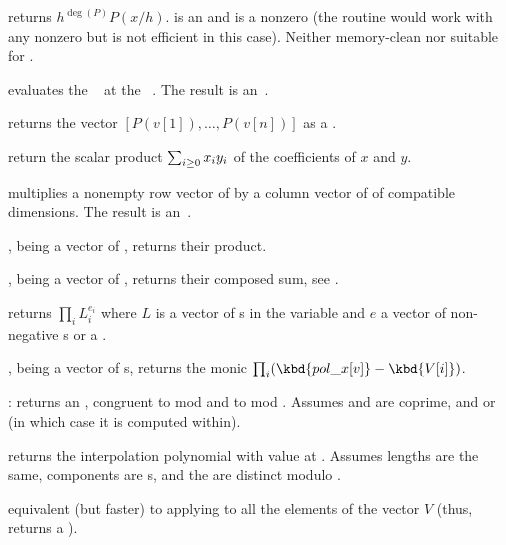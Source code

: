  returns $h^{\deg(P)} P(x/h)$.
 is an  and  is a nonzero  (the routine would
work with any nonzero  but is not efficient in this case).
Neither memory-clean nor suitable for .

 evaluates the ~
at the ~. The result is an~.

 returns the vector
$[P(v[1]),\ldots,P(v[n])]$ as a .

 return the scalar product
$\sum_{i\geq 0} x_i\*y_i$ of the coefficients of $x$ and $y$.

 multiplies a nonempty row
vector of  by a column vector of  of compatible dimensions.
The result is an~.

,  being a vector of ,
returns their product.

,  being a vector of ,
returns their composed sum, see .

 returns
$\prod_i L_i^{e_i}$ where $L$ is a vector of s in the variable 
and $e$ a vector of non-negative s or a .

,  being a vector
of s, returns the monic 
$\prod_i (\kbd{pol\_x[v]} - \kbd{V[i]})$.

:
returns an , congruent to  mod  and to  mod
. Assumes  and  are coprime, and 
or  (in which case it is computed within).

 returns the 
interpolation polynomial with value  at . Assumes lengths
are the same, components are s, and the  are distinct
modulo .

 equivalent (but
faster) to applying  to all the elements of the
vector $V$ (thus, returns a ).

